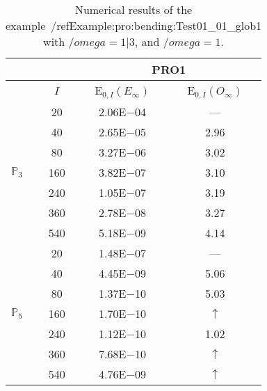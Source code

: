 \begin{table}[H]
\caption{Numerical results of the example~/ref{Example:pro:bending:Test01_01_glob1} with $/omega=1|3$, and $/omega=1$.}
\setlength{\tabcolsep}{5pt}
\centering
\begin{tabular}{@{}l c c c@{}}
\toprule
 &  & \multicolumn{2}{c}{PRO1}\\
\midrule
 & $I$ & E$_{0,I}(E_{\infty})$ & E$_{0,I}(O_{\infty})$\\
\midrule
\multirow{7}{*}{$\mathbb{P}_{3}$}
 & 20 & 2.06E$-$04 & ---\\
 & 40 & 2.65E$-$05 & 2.96\\
 & 80 & 3.27E$-$06 & 3.02\\
 & 160 & 3.82E$-$07 & 3.10\\
 & 240 & 1.05E$-$07 & 3.19\\
 & 360 & 2.78E$-$08 & 3.27\\
 & 540 & 5.18E$-$09 & 4.14\\
\midrule
\multirow{7}{*}{$\mathbb{P}_{5}$}
 & 20 & 1.48E$-$07 & ---\\
 & 40 & 4.45E$-$09 & 5.06\\
 & 80 & 1.37E$-$10 & 5.03\\
 & 160 & 1.70E$-$10 & $\uparrow$\\
 & 240 & 1.12E$-$10 & 1.02\\
 & 360 & 7.68E$-$10 & $\uparrow$\\
 & 540 & 4.76E$-$09 & $\uparrow$\\
\bottomrule
\end{tabular}
\label{Table:pRO:test_01_01_test2_pro2}
\end{table}
